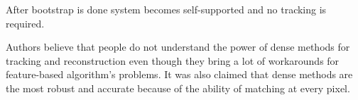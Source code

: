 \documentclass[../../../../main]{subfiles}
\begin{document}
After bootstrap is done system becomes self-supported and no tracking is required.

Authors believe that people do not understand the power of dense methods for tracking and reconstruction even though they bring a lot of workarounds for feature-based algorithm's problems. It was also claimed that dense methods are the most robust and accurate because of the ability of matching at every pixel.
\end{document}
